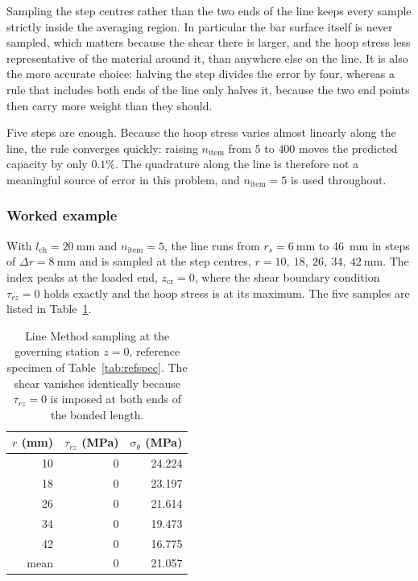 \newpage
Sampling the step centres rather than the two ends of the line keeps every
sample strictly inside the averaging region. In particular the bar surface
itself is never sampled, which matters because the shear there is larger, and
the hoop stress less representative of the material around it, than anywhere
else on the line. It is also the more accurate choice: halving the step
divides the error by four, whereas a rule that includes both ends of the line
only halves it, because the two end points then carry more weight than they
should.
 
Five steps are enough. Because the hoop stress varies almost linearly along
the line, the rule converges quickly: raising $n_{\mathrm{item}}$ from $5$ to
$400$ moves the predicted capacity by only $0.1\%$. The quadrature along the
line is therefore not a meaningful source of error in this problem, and
$n_{\mathrm{item}} = 5$ is used throughout.
 
\subsubsection*{Worked example}
 
With $l_{\mathrm{ch}} = \SI{20}{\milli\metre}$ and $n_{\mathrm{item}} = 5$,
the line runs from $r_s = \SI{6}{\milli\metre}$ to \SI{46}{\milli\metre} in
steps of $\Delta r = \SI{8}{\milli\metre}$ and is sampled at the step
centres, $r = 10,\ 18,\ 26,\ 34,\ \SI{42}{\milli\metre}$. The index peaks at
the loaded end, $z_{\mathrm{cr}} = 0$, where the shear boundary condition
$\tau_{rz} = 0$ holds exactly and the hoop stress is at its maximum. The five
samples are listed in Table~\ref{tab:lmexample}.
 
\begin{table}[htbp]
\centering
\caption{Line Method sampling at the governing station $z = 0$, reference
         specimen of Table~\ref{tab:refspec}. The shear vanishes identically
         because $\tau_{rz} = 0$ is imposed at both ends of the bonded
         length.}
\label{tab:lmexample}
\begin{tabular}{rrr}
\toprule
$r$ (\si{\milli\metre}) & $\tau_{rz}$ (\si{\mega\pascal}) & $\sigma_\theta$ (\si{\mega\pascal}) \\
\midrule
10 & 0 & 24.224 \\
18 & 0 & 23.197 \\
26 & 0 & 21.614 \\
34 & 0 & 19.473 \\
42 & 0 & 16.775 \\
\midrule
\multicolumn{1}{r}{mean} & 0 & 21.057 \\
\bottomrule
\end{tabular}
\end{table}
 
